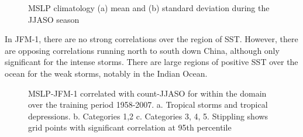 \begin{figure} %
	
	\caption{MSLP climatology (a) mean and (b) standard deviation during the JJASO season}\label{fig:mslp_JJASO}
\end{figure}


In JFM-1, there are no strong correlations over the region of SST. However, there are opposing correlations running north to south down China, although only significant for the intense storms. There are large regions of positive SST over the ocean for the weak storms, notably in the Indian Ocean.


\begin{figure}
	\centering
	
	\caption{MSLP-JFM-1 correlated with count-JJASO for within the domain over the training period 1958-2007. a. Tropical storms and tropical depressions. b. Categories 1,2 c. Categories 3, 4, 5. Stippling shows grid points with significant correlation at 95th percentile} \label{fig:corr_prevJFM_mslp} 
\end{figure} 

